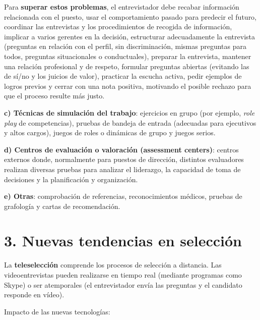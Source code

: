 \documentclass[12pt]{book} %
\begin{document}
Para \textbf{superar estos problemas}, el entrevistador debe recabar
información relacionada con el puesto, usar el comportamiento pasado
para predecir el futuro, coordinar las entrevistas y los procedimientos
de recogida de información, implicar a varios gerentes en la decisión,
estructurar adecuadamente la entrevista (preguntas en relación con el
perfil, sin discriminación, mismas preguntas para todos, preguntas
situacionales o conductuales), preparar la entrevista, mantener una
relación profesional y de respeto, formular preguntas abiertas (evitando
las de sí/no y los juicios de valor), practicar la escucha activa, pedir
ejemplos de logros previos y cerrar con una nota positiva, motivando el
posible rechazo para que el proceso resulte más justo.

\textbf{c) Técnicas de simulación del trabajo}: ejercicios en grupo (por
ejemplo, \emph{role play} de competencias), pruebas de bandeja de
entrada (adecuadas para ejecutivos y altos cargos), juegos de roles o
dinámicas de grupo y juegos serios.

\textbf{d) Centros de evaluación o valoración (assessment centers)}:
centros externos donde, normalmente para puestos de dirección, distintos
evaluadores realizan diversas pruebas para analizar el liderazgo, la
capacidad de toma de decisiones y la planificación y organización.

\textbf{e) Otras}: comprobación de referencias, reconocimientos médicos,
pruebas de grafología y cartas de recomendación.

\hypertarget{nuevas-tendencias-en-selecciuxf3n}{%
\section{3. Nuevas tendencias en
selección}\label{nuevas-tendencias-en-selecciuxf3n}}

La \textbf{teleselección} comprende los procesos de selección a
distancia. Las videoentrevistas pueden realizarse en tiempo real
(mediante programas como Skype) o ser atemporales (el entrevistador
envía las preguntas y el candidato responde en vídeo).

Impacto de las nuevas tecnologías:
\end{document}
